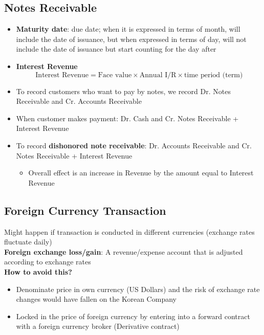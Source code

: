 \documentclass{article}
\begin{document}
\begin{multicols}{2}
\subsection{Notes Receivable}
\begin{itemize}
	\item \textbf{Maturity date}: due date; when it is expressed in terms of month, will include the date of issuance, but when expressed in terms of day, will not include the date of issuance but start counting for the day after
	\item \textbf{Interest Revenue}
	$$\text{Interest Revenue} = \text{Face value} \times \text{Annual I/R} \times \text{time period (term)}$$
	\item To record customers who want to pay by notes, we record Dr. Notes Receivable and Cr. Accounts Receivable
	\item When customer makes payment: Dr. Cash and Cr. Notes Receivable + Interest Revenue
	\item To record \textbf{dishonored note receivable}: Dr. Accounts Receivable and Cr. Notes Receivable + Interest Revenue
	\begin{itemize}
		\item Overall effect is an increase in Revenue by the amount equal to Interest Revenue
	\end{itemize}
\end{itemize}
\subsection{Foreign Currency Transaction}
Might happen if transaction is conducted in different currencies (exchange rates fluctuate daily)\\
\textbf{Foreign exchange loss/gain}: A revenue/expense account that is adjusted according to exchange rates\\
\textbf{How to avoid this?}
\begin{itemize}
	\item Denominate price in own currency (US Dollars) and the risk of exchange rate changes would have fallen on the Korean Company
	\item Locked in the price of foreign currency by entering into a forward contract with a foreign currency broker (Derivative contract)
\end{itemize}

\end{multicols}
\end{document}
